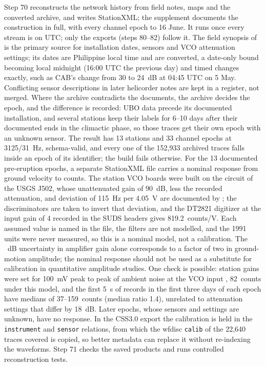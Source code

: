 \documentclass[linenum]{SSA-SRL}
\begin{document}
Step 70 reconstructs the network history from field notes, maps and the converted archive, and writes StationXML; the supplement documents the construction in full, with every channel epoch to 16 June. It runs once every stream is on UTC; only the exports (steps 80--82) follow it. The field synopsis of \citet{Lockhart_1996} is the primary source for installation dates, sensors and VCO attenuation settings; its dates are Philippine local time and are converted, a date-only bound becoming local midnight (16:00 UTC the previous day) and timed changes exactly, such as CAB's change from 30 to 24~dB at 04:45 UTC on 5 May. Conflicting sensor descriptions in later helicorder notes are kept in a register, not merged. Where the archive contradicts the documents, the archive decides the epoch, and the difference is recorded: UBO data precede its documented installation, and several stations keep their labels for 6--10 days after their documented ends in the climactic phase, so those traces get their own epoch with an unknown sensor. The result has 13 stations and 33 channel epochs at 3125/31~Hz, schema-valid, and every one of the 152,933 archived traces falls inside an epoch of its identifier; the build fails otherwise. For the 13 documented pre-eruption epochs, a separate StationXML file carries a nominal response from ground velocity to counts. The station VCO boards were built on the circuit of the USGS J502, whose unattenuated gain of 90~dB, less the recorded attenuation, and deviation of 115~Hz per 4.05~V are documented by \citet{McChesney_1999}; the discriminators are taken to invert that deviation, and the DT2821 digitizer at the input gain of 4 recorded in the SUDS headers gives 819.2~counts/V. Each assumed value is named in the file, the filters are not modelled, and the 1991 units were never measured, so this is a nominal model, not a calibration. The ~dB uncertainty in amplifier gain alone corresponds to a factor of two in ground-motion amplitude; the nominal response should not be used as a substitute for calibration in quantitative amplitude studies. One check is possible: station gains were set for 100~mV peak to peak of ambient noise at the VCO input \citep{Lockhart_1996}, 82~counts under this model, and the first 5~s of records in the first three days of each epoch have medians of 37--159~counts (median ratio 1.4), unrelated to attenuation settings that differ by 18~dB. Later epochs, whose sensors and settings are unknown, have no response. In the CSS3.0 export the calibration is held in the \texttt{instrument} and \texttt{sensor} relations, from which the wfdisc \texttt{calib} of the 22,640 traces covered is copied, so better metadata can replace it without re-indexing the waveforms. Step 71 checks the saved products and runs controlled reconstruction tests.
\end{document}
